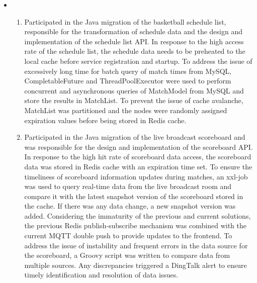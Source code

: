 \documentclass{resume}
\newcommand{\en}[1]{#1}
\newcommand{\zh}[1]{}
\begin{document}
\en{}
\zh{\datedsubsection{\textbf{\href{https://www.dell.com/en-us/blog/tags/dell-emc/}{DELL EMC，上海}}}{2021/10 -- 2022/02}}
\en{}
\zh{\role{VxRail VCF\&Netword Team}{后端开发实习生}}
\begin{itemize}
     \item \en{}
           \zh{参与旗下产品VxRail子平台VCF的迭代，负责平台自动配置功能及配置定制化GUI的设计与实现}
           \begin{enumerate}
                \item \en{Participated in the Java migration of the basketball schedule list, responsible for the transformation of schedule data and the design and implementation of the schedule list API. In response to the high access rate of the schedule list, the schedule data needs to be preheated to the local cache before service registration and startup. To address the issue of excessively long time for batch query of match times from MySQL, CompletableFuture and ThreadPoolExecutor were used to perform concurrent and asynchronous queries of MatchModel from MySQL and store the results in MatchList. To prevent the issue of cache avalanche, MatchList was partitioned and the nodes were randomly assigned expiration values before being stored in Redis cache.}
                      \zh{熟悉VxRail产品的整体架构，熟悉HCI、SDS、SDDC等概念；使用vSAN管理服务器集群，编写脚本部署配置；有效排查并快速修复bug，保证了产品的稳定上线。}
                \item \en{Participated in the Java migration of the live broadcast scoreboard and was responsible for the design and implementation of the scoreboard API. In response to the high hit rate of scoreboard data access, the scoreboard data was stored in Redis cache with an expiration time set. To ensure the timeliness of scoreboard information updates during matches, an xxl-job was used to query real-time data from the live broadcast room and compare it with the latest snapshot version of the scoreboard stored in the cache. If there was any data change, a new snapshot version was added. Considering the immaturity of the previous and current solutions, the previous Redis publish-subscribe mechanism was combined with the current MQTT double push to provide updates to the frontend. To address the issue of instability and frequent errors in the data source for the scoreboard, a Groovy script was written to compare data from multiple sources. Any discrepancies triggered a DingTalk alert to ensure timely identification and resolution of data issues.}

\end{enumerate}
\end{itemize}
\end{document}
